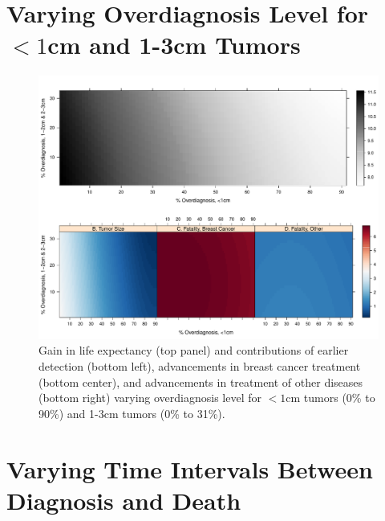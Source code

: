 \documentclass[11pt,letterpaper]{article}
\theoremstyle{plain}
\theoremstyle{remark}
\numberwithin{equation}{section}
\begin{document}
\newpage
\section{Varying Overdiagnosis Level for $<1$cm and 1-3cm Tumors}
\begin{figure}[h]
\begin{center}
\includegraphics[width=\linewidth]{appendix_figure2}
\caption{Gain in life expectancy (top panel) and contributions of
  earlier detection (bottom left), advancements in breast cancer
  treatment (bottom center), and
  advancements in treatment of other diseases (bottom right) varying overdiagnosis
  level for $<1$cm tumors (0\% to 90\%) and 1-3cm tumors (0\% to 31\%).} 
\label{fig:simple_case}
\end{center}
\end{figure}

\newpage
\section{Varying Time Intervals Between Diagnosis and Death}
\end{document}
